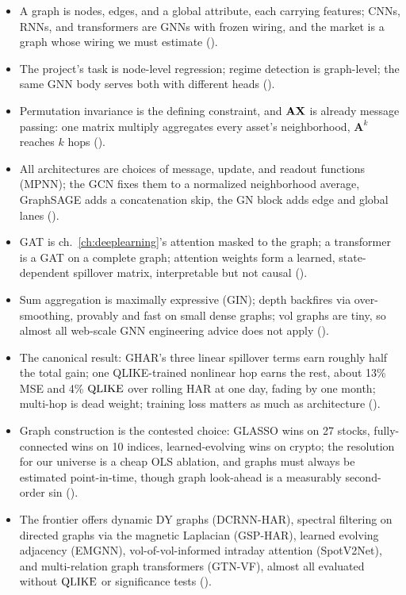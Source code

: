 \begin{itemize}[nosep]
  \item A graph is nodes, edges, and a global attribute, each carrying features; CNNs, RNNs, and transformers are GNNs with frozen wiring, and the market is a graph whose wiring we must estimate ().
  \item The project's task is node-level regression; regime detection is graph-level; the same GNN body serves both with different heads ().
  \item Permutation invariance is the defining constraint, and $\mathbf{A}\mathbf{X}$ is already message passing: one matrix multiply aggregates every asset's neighborhood, $\mathbf{A}^k$ reaches $k$ hops ().
  \item All architectures are choices of message, update, and readout functions (MPNN); the GCN fixes them to a normalized neighborhood average, GraphSAGE adds a concatenation skip, the GN block adds edge and global lanes ().
  \item GAT is ch.~\ref{ch:deeplearning}'s attention masked to the graph; a transformer is a GAT on a complete graph; attention weights form a learned, state-dependent spillover matrix, interpretable but not causal ().
  \item Sum aggregation is maximally expressive (GIN); depth backfires via over-smoothing, provably and fast on small dense graphs; vol graphs are tiny, so almost all web-scale GNN engineering advice does not apply ().
  \item The canonical result: GHAR's three linear spillover terms earn roughly half the total gain; one QLIKE-trained nonlinear hop earns the rest, about 13\% MSE and 4\% $\operatorname{QLIKE}$ over rolling HAR at one day, fading by one month; multi-hop is dead weight; training loss matters as much as architecture ().
  \item Graph construction is the contested choice: GLASSO wins on 27 stocks, fully-connected wins on 10 indices, learned-evolving wins on crypto; the resolution for our universe is a cheap OLS ablation, and graphs must always be estimated point-in-time, though graph look-ahead is a measurably second-order sin ().
  \item The frontier offers dynamic DY graphs (DCRNN-HAR), spectral filtering on directed graphs via the magnetic Laplacian (GSP-HAR), learned evolving adjacency (EMGNN), vol-of-vol-informed intraday attention (SpotV2Net), and multi-relation graph transformers (GTN-VF), almost all evaluated without $\operatorname{QLIKE}$ or significance tests ().

\end{itemize}
